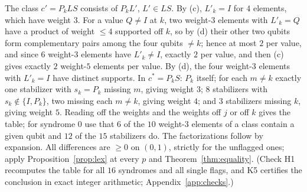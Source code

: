 \documentclass[11pt,a4paper]{article}
\theoremstyle{plain}
\theoremstyle{definition}
\theoremstyle{remark}
\begin{document}
The class $c'=P_kLS$ consists of $P_kL'$, $L'\in LS$. By (c), $L'_k=I$ for $4$ elements, which have weight $3$. For a value $Q\ne I$ at $k$, two weight-$3$ elements with $L'_k=Q$ have a product of weight $\le4$ supported off $k$, so by (d) their other two qubits form complementary pairs among the four qubits $\ne k$; hence at most $2$ per value, and since $6$ weight-$3$ elements have $L'_k\ne I$, exactly $2$ per value, and then (c) gives exactly $2$ weight-$5$ elements per value. By (d), the four weight-$3$ elements with $L'_k=I$ have distinct supports. In $c^\ast=P_kS$: $P_k$ itself; for each $m\ne k$ exactly one stabilizer with $s_k=P_k$ missing $m$, giving weight $3$; $8$ stabilizers with $s_k\notin\{I,P_k\}$, two missing each $m\ne k$, giving weight $4$; and $3$ stabilizers missing $k$, giving weight $5$. Reading off the weights and the weights off $j$ or off $k$ gives the table; for syndrome $0$ use that $6$ of the $10$ weight-$3$ elements of a class contain a given qubit and $12$ of the $15$ stabilizers do. The factorizations follow by expansion. All differences are $\ge0$ on $(0,1)$, strictly for the unflagged ones; apply Proposition~\ref{prop:lex} at every $p$ and Theorem~\ref{thm:equality}. (Check H1 recomputes the table for all $16$ syndromes and all single flags, and K5 certifies the conclusion in exact integer arithmetic; Appendix~\ref{app:checks}.)
\end{document}
